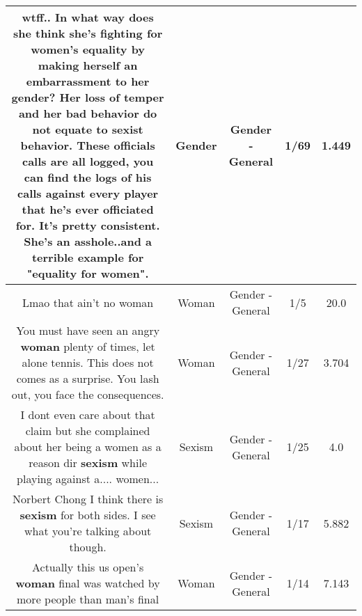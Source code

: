 \documentclass[11pt]{article}
\newlength\mylength
\begin{document}
\begin{center}
\begin{longtable}{|C{.65\mylength}|C{.30\mylength}|C{.12\mylength}|C{.12\mylength}|C{.12\mylength}|}
  \small wtff..  In what way does she think she's fighting for women's equality by making herself an embarrassment to her \textbf{gender}? Her loss of temper and her bad behavior do not equate to sexist behavior. These officials calls are all logged, you can find the logs of his calls against every player that he's ever officiated for. It's pretty consistent. She's an asshole..and a terrible example for "equality for women".\normalsize   & Gender & Gender - General & 1/69 & 1.449 \\  \hline
  \small Lmao that ain't no woman\normalsize   & Woman & Gender - General & 1/5 & 20.0 \\  \hline
  \small You must have seen an angry \textbf{woman} plenty of times, let alone tennis. This does not comes as a surprise. You lash out, you face the consequences.\normalsize   & Woman & Gender - General & 1/27 & 3.704 \\  \hline
  \small I dont even care about that claim but she complained about her being a women as a reason dir \textbf{sexism} while playing against a.... women...\normalsize   & Sexism & Gender - General & 1/25 & 4.0 \\  \hline
  \small Norbert Chong I think there is \textbf{sexism} for both sides. I see what you're talking about though.\normalsize   & Sexism & Gender - General & 1/17 & 5.882 \\  \hline
  \small Actually this us open's \textbf{woman} final was watched by more people than man's final\normalsize   & Woman & Gender - General & 1/14 & 7.143 \\  \hline

\end{longtable}
\end{center}
\end{document}
